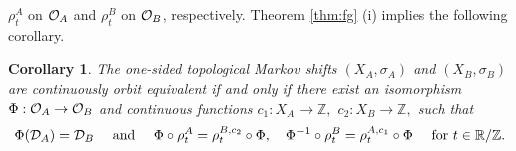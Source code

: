 \documentclass[11pt]{article}
\newtheorem{corollary}[theorem]{Corollary}
\theoremstyle{plain}
\theoremstyle{definition}
\numberwithin{equation}{section}
\newcommand{\RZ}{\mathbb{R}/{\mathbb{Z}}}
\newcommand{\Z}{\mathbb{Z}}
\begin{document}
$\rho_t^A$ on ${{\mathcal{O}}_A}$ and 
$\rho_t^B$ on ${{\mathcal{O}}_B}$, respectively.
Theorem \ref{thm:fg} (i) implies the following corollary.
\begin{corollary}\label{coro:COEgauge}
The one-sided topological Markov shifts
$(X_A, \sigma_A)$ and $(X_B,\sigma_B)$
are continuously orbit equivalent
if and only if  there exist an isomorphism
$\Phi:{{\mathcal{O}}_A} \rightarrow {{\mathcal{O}}_B}$
and continuous functions
$c_1:X_A \rightarrow \Z,$
$c_2:X_B \rightarrow \Z,$
 such that 
\begin{equation*}
\Phi(\DA) = \DB
\quad 
\text{  and }
\quad
\Phi \circ \rho^{A}_t = \rho^{B,c_2}_t \circ \Phi,
\quad
\Phi^{-1} \circ \rho^{B}_t = \rho^{A,c_1}_t \circ \Phi
\quad
\text{ for }
 t \in \RZ.
\end{equation*}
\end{corollary}


 
\end{document}
